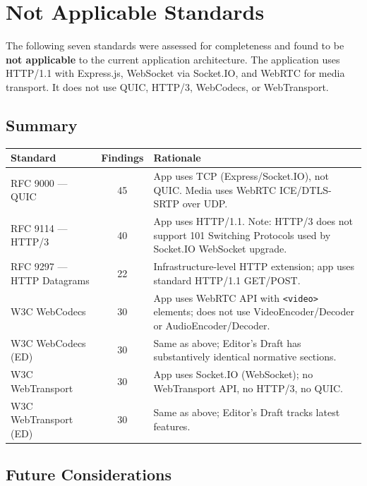 \documentclass[11pt,letterpaper]{article}
\begin{document}
\newpage

\section{Not Applicable Standards}

The following seven standards were assessed for completeness and found to be \textbf{not applicable} to the current application architecture. The application uses HTTP/1.1 with Express.js, WebSocket via Socket.IO, and WebRTC for media transport. It does not use QUIC, HTTP/3, WebCodecs, or WebTransport.

\subsection{Summary}

\begin{center}
\begin{tabularx}{\textwidth}{L{4.5cm}cL{7.5cm}}
\toprule
\textbf{Standard} & \textbf{Findings} & \textbf{Rationale} \\
\midrule
RFC 9000 --- QUIC & 45 & App uses TCP (Express/Socket.IO), not QUIC. Media uses WebRTC ICE/DTLS-SRTP over UDP. \\
\midrule
RFC 9114 --- HTTP/3 & 40 & App uses HTTP/1.1. Note: HTTP/3 does not support 101 Switching Protocols used by Socket.IO WebSocket upgrade. \\
\midrule
RFC 9297 --- HTTP Datagrams & 22 & Infrastructure-level HTTP extension; app uses standard HTTP/1.1 GET/POST. \\
\midrule
W3C WebCodecs & 30 & App uses WebRTC API with \texttt{<video>} elements; does not use VideoEncoder/Decoder or AudioEncoder/Decoder. \\
\midrule
W3C WebCodecs (ED) & 30 & Same as above; Editor's Draft has substantively identical normative sections. \\
\midrule
W3C WebTransport & 30 & App uses Socket.IO (WebSocket); no WebTransport API, no HTTP/3, no QUIC. \\
\midrule
W3C WebTransport (ED) & 30 & Same as above; Editor's Draft tracks latest features. \\
\bottomrule
\end{tabularx}
\end{center}

\subsection{Future Considerations}
\end{document}

